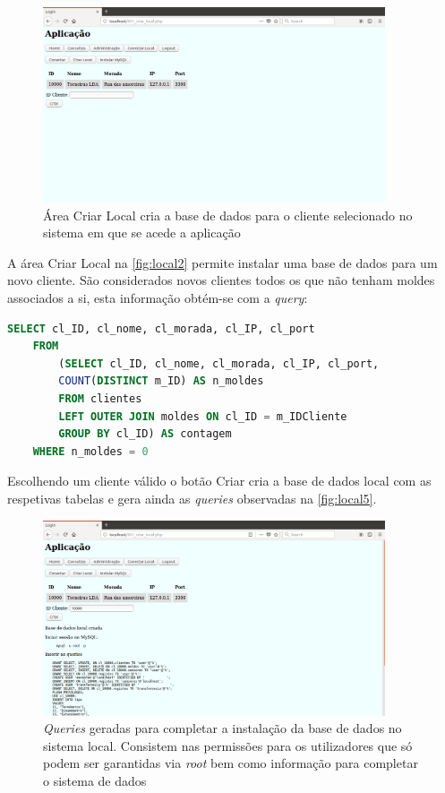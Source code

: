 \documentclass[11pt,twoside,a4paper]{report}
\begin{document}
	\begin{figure}[H]
		\centering
		\includegraphics[width=0.9\textwidth]{local02} %
		\caption{Área Criar Local cria a base de dados para o cliente selecionado no sistema em que se acede a aplicação}
		\label{fig:local2}
	\end{figure}
A área Criar Local na \autoref{fig:local2} permite instalar uma base de dados para um novo cliente. São considerados novos clientes todos os que não tenham moldes associados a si, esta informação obtém-se com a \textit{query}:
\newpage
\begin{lstlisting}[language = SQL]
	SELECT cl_ID, cl_nome, cl_morada, cl_IP, cl_port
	FROM
		(SELECT cl_ID, cl_nome, cl_morada, cl_IP, cl_port,
		COUNT(DISTINCT m_ID) AS n_moldes
		FROM clientes
		LEFT OUTER JOIN moldes ON cl_ID = m_IDCliente
		GROUP BY cl_ID) AS contagem
	WHERE n_moldes = 0
\end{lstlisting}
Escolhendo um cliente válido o botão Criar cria a base de dados local com as respetivas tabelas e gera ainda as \textit{queries} observadas na \autoref{fig:local5}.
\begin{figure}[H]
	\begin{center}
		\includegraphics[width=0.9\textwidth]{local03} %
		\caption{\textit{Queries} geradas para completar a instalação da base de dados no sistema local. Consistem nas permissões para os utilizadores que só podem ser garantidas via \textit{root} bem como informação para completar o sistema de dados}
		\label{fig:local5}
	\end{center}
\end{figure}
\end{document}
